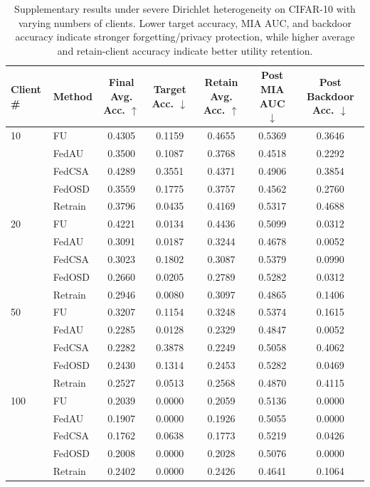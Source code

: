 \begin{table}[t]
\centering
\caption{Supplementary results under severe Dirichlet heterogeneity on CIFAR-10 with varying numbers of clients. Lower target accuracy, MIA AUC, and backdoor accuracy indicate stronger forgetting/privacy protection, while higher average and retain-client accuracy indicate better utility retention.}
\label{tab:client_count_results}
\begin{tabular}{llccccc}
\toprule
Client \# & Method & Final Avg. Acc. $\uparrow$ & Target Acc. $\downarrow$ & Retain Avg. Acc. $\uparrow$ & Post MIA AUC $\downarrow$ & Post Backdoor Acc. $\downarrow$ \\
\midrule
10 & FU & 0.4305 & 0.1159 & 0.4655 & 0.5369 & 0.3646 \\
 & FedAU & 0.3500 & 0.1087 & 0.3768 & 0.4518 & 0.2292 \\
 & FedCSA & 0.4289 & 0.3551 & 0.4371 & 0.4906 & 0.3854 \\
 & FedOSD & 0.3559 & 0.1775 & 0.3757 & 0.4562 & 0.2760 \\
 & Retrain & 0.3796 & 0.0435 & 0.4169 & 0.5317 & 0.4688 \\
\midrule
20 & FU & 0.4221 & 0.0134 & 0.4436 & 0.5099 & 0.0312 \\
 & FedAU & 0.3091 & 0.0187 & 0.3244 & 0.4678 & 0.0052 \\
 & FedCSA & 0.3023 & 0.1802 & 0.3087 & 0.5379 & 0.0990 \\
 & FedOSD & 0.2660 & 0.0205 & 0.2789 & 0.5282 & 0.0312 \\
 & Retrain & 0.2946 & 0.0080 & 0.3097 & 0.4865 & 0.1406 \\
\midrule
50 & FU & 0.3207 & 0.1154 & 0.3248 & 0.5374 & 0.1615 \\
 & FedAU & 0.2285 & 0.0128 & 0.2329 & 0.4847 & 0.0052 \\
 & FedCSA & 0.2282 & 0.3878 & 0.2249 & 0.5058 & 0.4062 \\
 & FedOSD & 0.2430 & 0.1314 & 0.2453 & 0.5282 & 0.0469 \\
 & Retrain & 0.2527 & 0.0513 & 0.2568 & 0.4870 & 0.4115 \\
\midrule
100 & FU & 0.2039 & 0.0000 & 0.2059 & 0.5136 & 0.0000 \\
 & FedAU & 0.1907 & 0.0000 & 0.1926 & 0.5055 & 0.0000 \\
 & FedCSA & 0.1762 & 0.0638 & 0.1773 & 0.5219 & 0.0426 \\
 & FedOSD & 0.2008 & 0.0000 & 0.2028 & 0.5076 & 0.0000 \\
 & Retrain & 0.2402 & 0.0000 & 0.2426 & 0.4641 & 0.1064 \\
\bottomrule
\end{tabular}
\end{table}